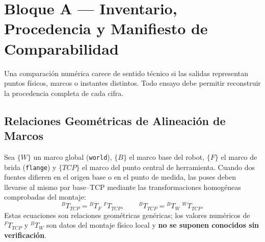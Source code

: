 \documentclass[10pt, a4paper]{article}
\begin{document}
\section{Bloque A — Inventario, Procedencia y Manifiesto de Comparabilidad}

Una comparación numérica carece de sentido técnico si las salidas representan puntos físicos, marcos o instantes distintos. Todo ensayo debe permitir reconstruir la procedencia completa de cada cifra.

\subsection{Relaciones Geométricas de Alineación de Marcos}
Sea $\{W\}$ un marco global (\texttt{world}), $\{B\}$ el marco base del robot, $\{F\}$ el marco de brida (\texttt{flange}) y $\{TCP\}$ el marco del punto central de herramienta. Cuando dos fuentes difieren en el origen base o en el punto de medida, las poses deben llevarse al mismo par base–TCP mediante las transformaciones homogéneas comprobadas del montaje:
\begin{equation}
    {}^{B}T_{TCP} = {}^{B}T_{F}\;{}^{F}T_{TCP}, \qquad
    {}^{B}T_{TCP} = {}^{B}T_{W}\;{}^{W}T_{TCP}.
    \label{eq:frame_align}
\end{equation}
Estas ecuaciones son relaciones geométricas genéricas; los valores numéricos de ${}^{F}T_{TCP}$ y ${}^{B}T_{W}$ son datos del montaje físico local y \textbf{no se suponen conocidos sin verificación}.
\end{document}
